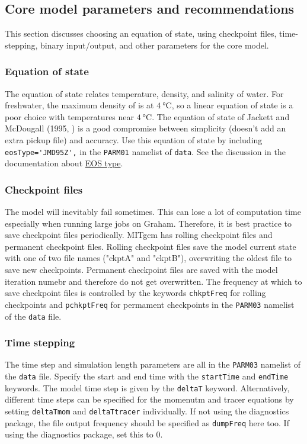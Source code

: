 \documentclass[11pt]{article}
\begin{document}
\subsection{Core model parameters and recommendations}
This section discusses choosing an equation of state, using checkpoint files, time-stepping, binary input/output, and other parameters for the core model.

\subsubsection{Equation of state}
The equation of state relates temperature, density, and salinity of water. For freshwater, the maximum density of is at $\SI{4}{\celsius}$, so a linear equation of state is a poor choice with temperatures near $\SI{4}{\celsius}$. The equation of state of Jackett and McDougall (1995, \cite{JackettMcDougall1995}) is a good compromise between simplicity (doesn't add an extra pickup file) and accuracy. Use this equation of state by including \verb|eosType='JMD95Z',| in the \verb|PARM01| namelist of \verb|data|. See the discussion in the documentation about \href{https://mitgcm.readthedocs.io/en/latest/getting_started/getting_started.html#parameters-equation-of-state}{EOS type}.

\subsubsection{Checkpoint files}
The model will inevitably fail sometimes. This can lose a lot of computation time especially when running large jobs on Graham. Therefore, it is best practice to save checkpoint files periodically. MITgcm has rolling checkpoint files and permanent checkpoint files. Rolling checkpoint files save the model current state with one of two file names ("ckptA" and "ckptB"), overwriting the oldest file to save new checkpoints. Permanent checkpoint files are saved with the model iteration numebr and therefore do not get overwritten. The frequency at which to save checkpoint files is controlled by the keywords \verb|chkptFreq| for rolling checkpoints and \verb|pchkptFreq| for permament checkpoints in the \verb|PARM03| namelist of the \verb|data| file.

\subsubsection{Time stepping}
The time step and simulation length parameters are all in the \verb|PARM03| namelist of the \verb|data| file. Specify the start and end time with the \verb|startTime| and \verb|endTime| keywords. The model time step is given by the \verb|deltaT| keyword. Alternatively, different time steps can be specified for the momenutm and tracer equations by setting \verb|deltaTmom| and \verb|deltaTtracer| individually. If not using the diagnostics package, the file output frequency should be specified as \verb|dumpFreq| here too. If using the diagnostics package, set this to 0.
\end{document}
